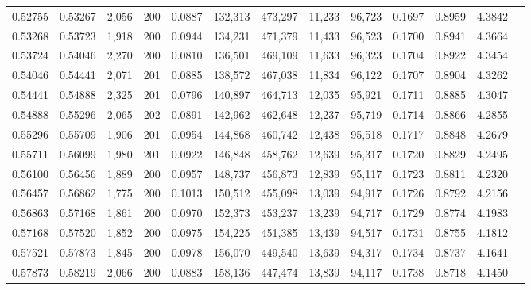 \begin{tabular}{rrrrrrrrrrrrr}
0.52755 & 0.53267 & 2,056 & 200 &                                     0.0887 & 132,313 & 473,297 &  11,233 &  96,723 & 0.1697 & 0.8959 & 4.3842 \\
0.53268 & 0.53723 & 1,918 & 200 &                                     0.0944 & 134,231 & 471,379 &  11,433 &  96,523 & 0.1700 & 0.8941 & 4.3664 \\
0.53724 & 0.54046 & 2,270 & 200 &                                     0.0810 & 136,501 & 469,109 &  11,633 &  96,323 & 0.1704 & 0.8922 & 4.3454 \\
0.54046 & 0.54441 & 2,071 & 201 &                                     0.0885 & 138,572 & 467,038 &  11,834 &  96,122 & 0.1707 & 0.8904 & 4.3262 \\
0.54441 & 0.54888 & 2,325 & 201 &                                     0.0796 & 140,897 & 464,713 &  12,035 &  95,921 & 0.1711 & 0.8885 & 4.3047 \\
0.54888 & 0.55296 & 2,065 & 202 &                                     0.0891 & 142,962 & 462,648 &  12,237 &  95,719 & 0.1714 & 0.8866 & 4.2855 \\
0.55296 & 0.55709 & 1,906 & 201 &                                     0.0954 & 144,868 & 460,742 &  12,438 &  95,518 & 0.1717 & 0.8848 & 4.2679 \\
0.55711 & 0.56099 & 1,980 & 201 &                                     0.0922 & 146,848 & 458,762 &  12,639 &  95,317 & 0.1720 & 0.8829 & 4.2495 \\
0.56100 & 0.56456 & 1,889 & 200 &                                     0.0957 & 148,737 & 456,873 &  12,839 &  95,117 & 0.1723 & 0.8811 & 4.2320 \\
0.56457 & 0.56862 & 1,775 & 200 &                                     0.1013 & 150,512 & 455,098 &  13,039 &  94,917 & 0.1726 & 0.8792 & 4.2156 \\
0.56863 & 0.57168 & 1,861 & 200 &                                     0.0970 & 152,373 & 453,237 &  13,239 &  94,717 & 0.1729 & 0.8774 & 4.1983 \\
0.57168 & 0.57520 & 1,852 & 200 &                                     0.0975 & 154,225 & 451,385 &  13,439 &  94,517 & 0.1731 & 0.8755 & 4.1812 \\
0.57521 & 0.57873 & 1,845 & 200 &                                     0.0978 & 156,070 & 449,540 &  13,639 &  94,317 & 0.1734 & 0.8737 & 4.1641 \\
0.57873 & 0.58219 & 2,066 & 200 &                                     0.0883 & 158,136 & 447,474 &  13,839 &  94,117 & 0.1738 & 0.8718 & 4.1450 \\

\end{tabular}
